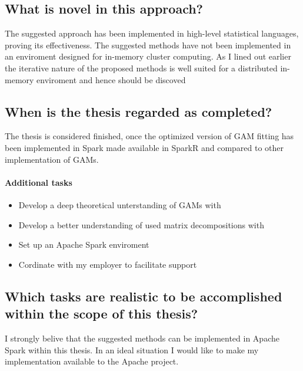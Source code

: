 \documentclass{article}
\begin{document}
    \subsection{What is novel in this approach?}
    The suggested approach has been implemented in high-level statistical languages, proving its effectiveness. The suggested methods have not been implemented in an enviroment designed for in-memory cluster computing. As I lined out earlier the iterative nature of the proposed methods is well suited for a distributed in-memory enviroment and hence should be discoved

    \subsection{When is the thesis regarded as completed?}
    The thesis is considered finished, once the optimized version of GAM fitting has been implemented in Spark made available in SparkR and compared to other implementation of GAMs.

    \paragraph{Additional tasks}
        \begin{itemize}
            \item Develop a deep theoretical unterstanding of GAMs with \cite{gamBook}
            \item Develop a better understanding of used matrix decompositions with \cite{strang09}
            \item Set up an Apache Spark enviroment
            \item Cordinate with my employer to facilitate support
        \end{itemize}

    \subsection{Which tasks are realistic to be accomplished within the scope of this thesis?}
    I strongly belive that the suggested methods can be implemented in Apache Spark within this thesis. In an ideal situation I would like to make my implementation available to the Apache project.
\end{document}
